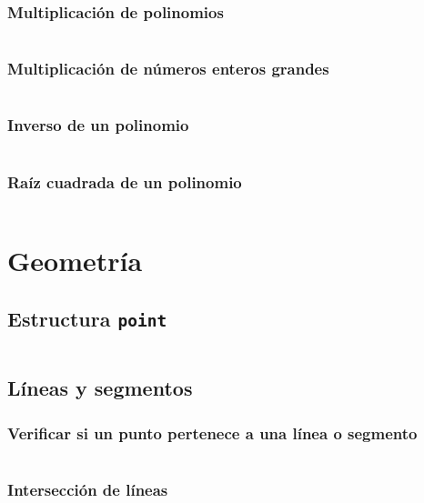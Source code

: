 \documentclass[11pt]{article}
\begin{document}
			\subsubsection{Multiplicación de polinomios}
			\inputminted[tabsize=2,breaklines,firstline=92,lastline=118,fontsize=\small]{c++}{fft.cpp}
			
			\subsubsection{Multiplicación de números enteros grandes}
			\inputminted[tabsize=2,breaklines,firstline=120,lastline=156,fontsize=\small]{c++}{fft.cpp}
			
			\subsubsection{Inverso de un polinomio}
			\inputminted[tabsize=2,breaklines,firstline=158,lastline=184,fontsize=\small]{c++}{fft.cpp}
			
			\subsubsection{Raíz cuadrada de un polinomio}
			\inputminted[tabsize=2,breaklines,firstline=186,lastline=208,fontsize=\small]{c++}{fft.cpp}
			
	\newpage
	\section{Geometría}
		\subsection{Estructura \texttt{point}}
		\inputminted[tabsize=2,breaklines,firstline=4,lastline=97,fontsize=\small]{c++}{geometry.cpp}
		
		\subsection{Líneas y segmentos}
			\subsubsection{Verificar si un punto pertenece a una línea o segmento}
			\inputminted[tabsize=2,breaklines,firstline=102,lastline=111,fontsize=\small]{c++}{geometry.cpp}
			
			\subsubsection{Intersección de líneas}
			\inputminted[tabsize=2,breaklines,firstline=113,lastline=133,fontsize=\small]{c++}{geometry.cpp}
			
\end{document}
